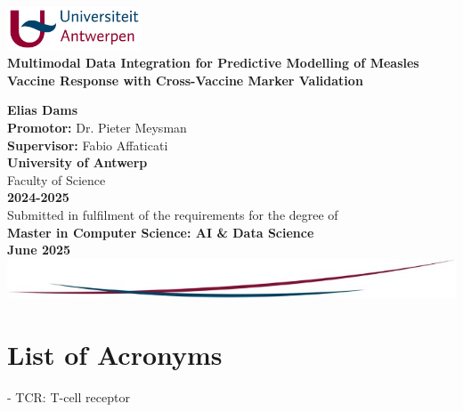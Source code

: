 \documentclass[12pt,a4paper]{report}
\begin{document}
\begin{titlepage}
    \centering
    
    \includegraphics[width=0.3\textwidth]{images/uantwerpen_logo.jpg}\\[1cm]
    
    {\Huge \textbf{Multimodal Data Integration for Predictive Modelling of Measles Vaccine Response with Cross-Vaccine Marker Validation}} \\
    \vfill
    
    {\Large \textbf{Elias Dams}}\\[1cm]
    
    \textbf{Promotor:} Dr. Pieter Meysman\\
    \textbf{Supervisor:} Fabio Affaticati\\[1.5cm]
    
    {\Large \textbf{University of Antwerp}}\\
    {\large Faculty of Science}\\[0.5cm]
    
    \textbf{2024-2025}\\[1.5cm]
    
    Submitted in fulfilment of the requirements for the degree of\\
    \textbf{Master in Computer Science: AI \& Data Science}\\[1cm]
    
    \textbf{June 2025}\\[2cm]
    
    \vfill
    \includegraphics[width=1.0\textwidth]{images/bottom_design.jpg}

\end{titlepage}


\tableofcontents
\newpage

\listoffigures

\listoftables

\chapter*{List of Acronyms}
- TCR: T-cell receptor
\end{document}
